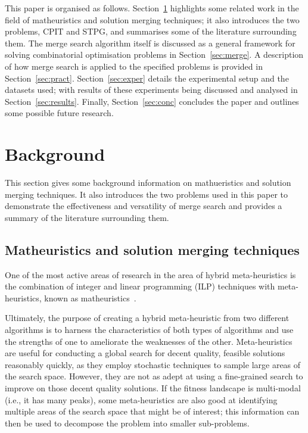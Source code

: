 \documentclass[journal]{IEEEtran}
\begin{document}
This paper is organised as follows. Section~\ref{sec:back} highlights some related work in the field of matheuristics and solution merging techniques; it also introduces the two problems, CPIT and STPG, and summarises some of the literature surrounding them. The merge search algorithm itself is discussed as a general framework for solving combinatorial optimisation problems in Section~\ref{sec:merge}. A description of how merge search is applied to the specified problems is provided in Section~\ref{sec:pract}. Section~\ref{sec:exper} details the experimental setup and the datasets used; with results of these experiments being discussed and analysed in Section~\ref{sec:results}. Finally, Section~\ref{sec:conc} concludes the paper and outlines some possible future research.

\section{Background}\label{sec:back}
This section gives some background information on mathueristics and solution merging techniques.
It also introduces the two problems used in this paper to demonstrate the effectiveness and versatility of merge search and provides a summary of the literature surrounding them.

\subsection{Matheuristics and solution merging techniques}
One of the most active areas of research in the area of hybrid meta-heuristics is the combination of integer and linear programming (ILP) techniques with meta-heuristics, known as matheuristics~\cite{matheuristics}.  

Ultimately, the purpose of creating a hybrid meta-heuristic from two different algorithms is to harness the characteristics of both types of algorithms and use the strengths of one to ameliorate the weaknesses of the other. Meta-heuristics are useful for conducting a global search for decent quality, feasible solutions reasonably quickly, as they employ stochastic techniques to sample large areas of the search space. However, they are not as adept at using a fine-grained search to improve on those decent quality solutions. If the fitness landscape is multi-modal (i.e., it has many peaks), some meta-heuristics are also good at identifying multiple areas of the search space that might be of interest; this information can then be used to decompose the problem into smaller sub-problems. 
\end{document}
